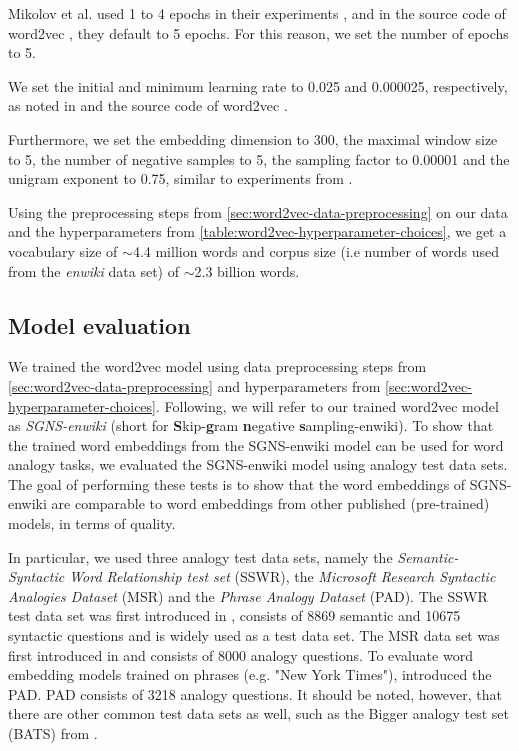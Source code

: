 Mikolov et al. used 1 to 4 epochs in their experiments \cite{mikolov2013a, mikolov2013b}, and in the source code of word2vec \cite[line 43]{Word2vecCCode}, they default to 5 epochs. For this reason, we set the number of epochs to 5.

We set the initial and minimum learning rate to 0.025 and 0.000025, respectively, as noted in \cite{mikolov2013a} and the source code of word2vec \cite[lines 44 and 398]{Word2vecCCode}.

Furthermore, we set the embedding dimension to 300, the maximal window size to 5, the number of negative samples to 5, the sampling factor to 0.00001 and the unigram exponent to 0.75, similar to experiments from \cite{mikolov2013b}.

Using the preprocessing steps from \cref{sec:word2vec-data-preprocessing} on our data and the hyperparameters from \cref{table:word2vec-hyperparameter-choices}, we get a vocabulary size of $\sim$4.4 million words and corpus size (i.e number of words used from the \textit{enwiki} data set) of $\sim$2.3 billion words.

\subsection{Model evaluation}
\label{sec:word2vec-model-evaluation}
We trained the word2vec model using data preprocessing steps from \cref{sec:word2vec-data-preprocessing} and hyperparameters from \cref{sec:word2vec-hyperparameter-choices}. Following, we will refer to our trained word2vec model as \textit{SGNS-enwiki} (short for \textbf{S}kip-\textbf{g}ram \textbf{n}egative \textbf{s}ampling-enwiki). To show that the trained word embeddings from the SGNS-enwiki model can be used for word analogy tasks, we evaluated the SGNS-enwiki model using analogy test data sets. The goal of performing these tests is to show that the word embeddings of SGNS-enwiki are comparable to word embeddings from other published (pre-trained) models, in terms of quality.

In particular, we used three analogy test data sets, namely the \textit{Semantic-Syntactic Word Relationship test set} (SSWR), the \textit{Microsoft Research Syntactic Analogies Dataset} (MSR) and the \textit{Phrase Analogy Dataset} (PAD). The SSWR test data set was first introduced in \cite{mikolov2013a}, consists of 8869 semantic and 10675 syntactic questions and is widely used as a test data set. The MSR data set was first introduced in \cite{mikolov-etal-2013-linguistic} and consists of 8000 analogy questions. To evaluate word embedding models trained on phrases (e.g. "New York Times"), \cite{mikolov2013b} introduced the PAD. PAD consists of 3218 analogy questions. It should be noted, however, that there are other common test data sets as well, such as the Bigger analogy test set (BATS) from \cite{gladkova-etal-2016-analogy}.

